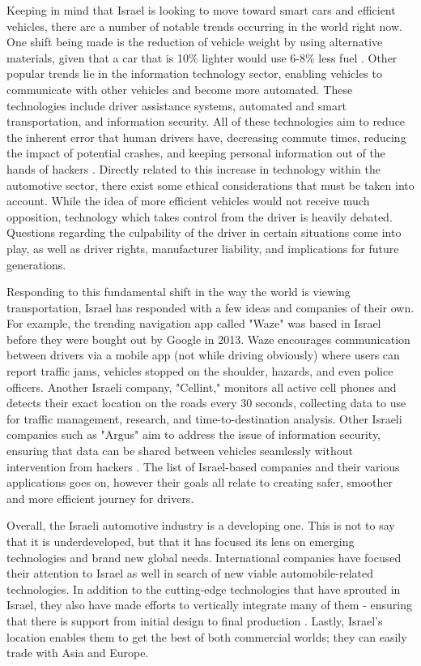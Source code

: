 \documentclass{article}                         %
\begin{document}
Keeping in mind that Israel is looking to move toward smart cars and efficient vehicles, there are a number of notable trends occurring in the world right now. One shift being made is the reduction of vehicle weight by using alternative materials, given that a car that is 10\% lighter would use 6-8\% less fuel \cite{MinistryofEconomyandIndustryStateofIsraelTheIsrael}. Other popular trends lie in the information technology sector, enabling vehicles to communicate with other vehicles and become more automated. These technologies include driver assistance systems, automated and smart transportation, and information security. All of these technologies aim to reduce the inherent error that human drivers have, decreasing commute times, reducing the impact of potential crashes, and keeping personal information out of the hands of hackers \cite{MinistryofEconomyandIndustryStateofIsraelTheIsrael}. Directly related to this increase in technology within the automotive sector, there exist some ethical considerations that must be taken into account. While the idea of more efficient vehicles would not receive much opposition, technology which takes control from the driver is heavily debated. Questions regarding the culpability of the driver in certain situations come into play, as well as driver rights, manufacturer liability, and implications for future generations. 

Responding to this fundamental shift in the way the world is viewing transportation, Israel has responded with a few ideas and companies of their own. For example, the trending navigation app called "Waze" was based in Israel before they were bought out by Google in 2013. Waze encourages communication between drivers via a mobile app (not while driving obviously) where users can report traffic jams, vehicles stopped on the shoulder, hazards, and even police officers. Another Israeli company, "Cellint," monitors all active cell phones and detects their exact location on the roads every 30 seconds, collecting data to use for traffic management, research, and time-to-destination analysis. Other Israeli companies such as "Argus" aim to address the issue of information security, ensuring that data can be shared between vehicles seamlessly without intervention from hackers \cite{MinistryofEconomyandIndustryStateofIsraelTheIsrael}. The list of Israel-based companies and their various applications goes on, however their goals all relate to creating safer, smoother and more efficient journey for drivers.

Overall, the Israeli automotive industry is a developing one. This is not to say that it is underdeveloped, but that it has focused its lens on emerging technologies and brand new global needs. International companies have focused their attention to Israel as well in search of new viable automobile-related technologies. In addition to the cutting-edge technologies that have sprouted in Israel, they also have made efforts to vertically integrate many of them - ensuring that there is support from initial design to final production \cite{MinistryofEconomyandIndustryStateofIsraelTheIsrael}. Lastly, Israel's location enables them to get the best of both commercial worlds; they can easily trade with Asia and Europe.
\end{document}
